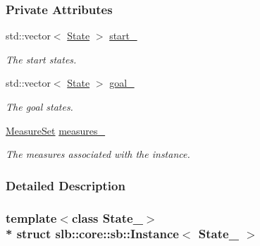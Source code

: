\subsubsection*{Private Attributes}
\begin{DoxyCompactItemize}
\item 
std\+::vector$<$ \hyperlink{structslb_1_1core_1_1sb_1_1Instance_a631205b5ee8d1a61a05c0d30f766ef2e}{State} $>$ \hyperlink{structslb_1_1core_1_1sb_1_1Instance_a24750a1b89d7a89fddfb4876886303cb}{start\+\_\+}\hypertarget{structslb_1_1core_1_1sb_1_1Instance_a24750a1b89d7a89fddfb4876886303cb}{}\label{structslb_1_1core_1_1sb_1_1Instance_a24750a1b89d7a89fddfb4876886303cb}

\begin{DoxyCompactList}\small\item\em The start states. \end{DoxyCompactList}\item 
std\+::vector$<$ \hyperlink{structslb_1_1core_1_1sb_1_1Instance_a631205b5ee8d1a61a05c0d30f766ef2e}{State} $>$ \hyperlink{structslb_1_1core_1_1sb_1_1Instance_a618ac3cc9e2ab9293daa937a46169f79}{goal\+\_\+}\hypertarget{structslb_1_1core_1_1sb_1_1Instance_a618ac3cc9e2ab9293daa937a46169f79}{}\label{structslb_1_1core_1_1sb_1_1Instance_a618ac3cc9e2ab9293daa937a46169f79}

\begin{DoxyCompactList}\small\item\em The goal states. \end{DoxyCompactList}\item 
\hyperlink{structslb_1_1core_1_1sb_1_1MeasureSet}{Measure\+Set} \hyperlink{structslb_1_1core_1_1sb_1_1Instance_add0bcde31b71ac69725233b1e33d6a7b}{measures\+\_\+}\hypertarget{structslb_1_1core_1_1sb_1_1Instance_add0bcde31b71ac69725233b1e33d6a7b}{}\label{structslb_1_1core_1_1sb_1_1Instance_add0bcde31b71ac69725233b1e33d6a7b}

\begin{DoxyCompactList}\small\item\em The measures associated with the instance. \end{DoxyCompactList}\end{DoxyCompactItemize}


\subsubsection{Detailed Description}
\subsubsection*{template$<$class State\+\_\+$>$\\*
struct slb\+::core\+::sb\+::\+Instance$<$ State\+\_\+ $>$}


